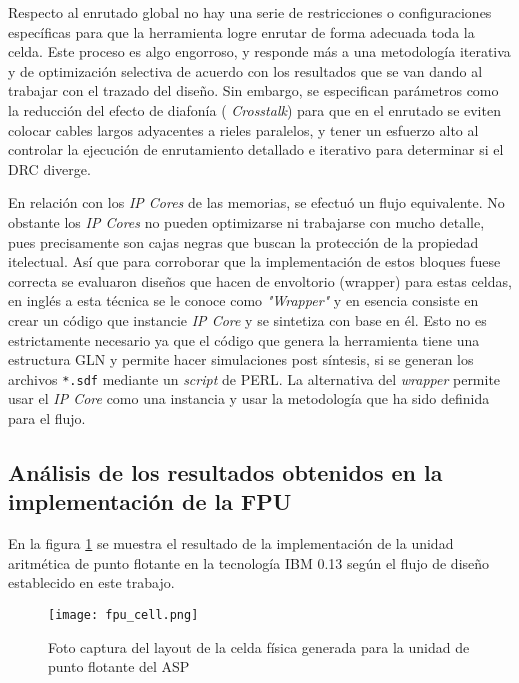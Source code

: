 Respecto al enrutado global no hay una serie de restricciones o configuraciones específicas para que la herramienta logre enrutar de forma adecuada toda la celda. Este proceso es algo engorroso, y responde más a una metodología iterativa y de optimización selectiva de acuerdo con los resultados que se van dando al trabajar con el trazado del diseño. Sin embargo, se especifican parámetros como la reducción del efecto de diafonía ( \textit{Crosstalk}) para que en el enrutado se eviten colocar cables largos adyacentes a rieles paralelos, y tener un esfuerzo alto al controlar la ejecución de enrutamiento detallado e iterativo para determinar si el DRC diverge.

En relación con los \textit{IP Cores} de las memorias, se efectuó un flujo equivalente. No obstante los \textit{IP Cores} no pueden optimizarse ni trabajarse con mucho detalle, pues precisamente son cajas negras que buscan la protección de la propiedad itelectual. Así que para corroborar que la implementación de estos bloques fuese correcta se evaluaron diseños que hacen de envoltorio (wrapper) para estas celdas, en inglés a esta técnica se le conoce como \textit{"Wrapper"} y en esencia consiste en crear un código que instancie \textit{IP Core} y se sintetiza con base en él. Esto no es estrictamente necesario ya que el código que genera la herramienta tiene una estructura GLN y permite hacer simulaciones post síntesis, si se generan los archivos \texttt{*.sdf} mediante un \textit{script} de PERL. La alternativa del \textit{wrapper} permite usar el \textit{IP Core} como una instancia y usar la metodología que ha sido definida para el flujo.

\subsection{Análisis de los resultados obtenidos en la implementación de la FPU}

En la figura \ref{fig:fpu_cell} se muestra el resultado de la implementación de la unidad aritmética de punto flotante en la tecnología IBM 0.13 según el flujo de diseño establecido en este trabajo.

\begin{figure}[h]
	\texttt{[image: fpu\_cell.png]}
	\centering
	\caption{Foto captura del layout de la celda física generada para la unidad de punto flotante del ASP}
	\label{fig:fpu_cell}
\end{figure}

